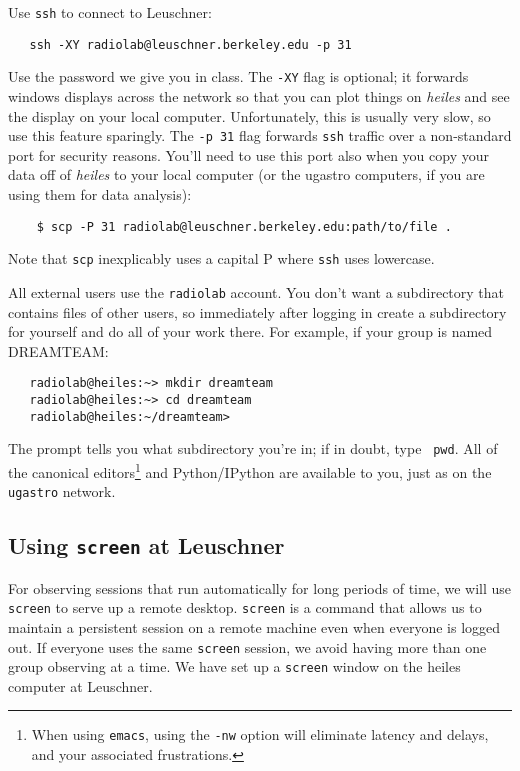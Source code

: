 \documentclass[psfig,preprint]{aastex}
\begin{document}
\noindent
Use {\tt ssh} to connect to Leuschner:
\begin{verbatim}
   ssh -XY radiolab@leuschner.berkeley.edu -p 31
\end{verbatim}
\noindent
Use the password we give you in class. The {\tt -XY} flag is optional; it forwards windows displays across the network so that you can plot
things on {\it heiles} and see the display on your local computer.
Unfortunately, this is usually very slow, so use this feature sparingly.
The {\tt -p 31} flag forwards {\tt ssh} traffic over a non-standard port
for security reasons. You'll need to use this port also when you copy
your data off of {\it heiles} to your local computer (or the ugastro
computers, if you are using them for data analysis):
\begin{verbatim}
    $ scp -P 31 radiolab@leuschner.berkeley.edu:path/to/file .
\end{verbatim}
\noindent
Note that {\tt scp} inexplicably uses a capital P where {\tt ssh} uses
lowercase.

All external users use the {\tt radiolab} account. You don't
want a subdirectory that contains files of other users, so immediately
after logging in create a subdirectory for yourself and do all of your
work there. For example, if your group is named DREAMTEAM: 
\begin{verbatim}
   radiolab@heiles:~> mkdir dreamteam
   radiolab@heiles:~> cd dreamteam
   radiolab@heiles:~/dreamteam> 
\end{verbatim}
The prompt tells you what subdirectory you're in; if in doubt, type {\tt
  pwd}. All of the canonical editors\footnote{When using {\tt emacs}, using the
  {\tt -nw} option will eliminate latency and delays, and your
  associated frustrations.} and Python/IPython are available to you, just as on the
{\tt ugastro} network.

\subsection {Using \texttt{screen} at Leuschner}

\noindent
For observing sessions that run automatically for long periods of
time, we will use \texttt{screen} to serve up a remote desktop. \texttt{screen} is a command that allows us to maintain a persistent session on a remote machine even when everyone is logged out. If everyone uses the same \texttt{screen} session, we avoid having more than one group observing at a time. We have set up a \texttt{screen} window on the heiles computer at Leuschner.  
\end{document}
